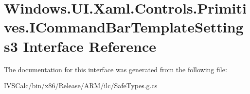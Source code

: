 \hypertarget{interface_windows_1_1_u_i_1_1_xaml_1_1_controls_1_1_primitives_1_1_i_command_bar_template_settings3}{}\section{Windows.\+U\+I.\+Xaml.\+Controls.\+Primitives.\+I\+Command\+Bar\+Template\+Settings3 Interface Reference}
\label{interface_windows_1_1_u_i_1_1_xaml_1_1_controls_1_1_primitives_1_1_i_command_bar_template_settings3}


The documentation for this interface was generated from the following file\+:\begin{DoxyCompactItemize}
\item 
I\+V\+S\+Calc/bin/x86/\+Release/\+A\+R\+M/ilc/Safe\+Types.\+g.\+cs\end{DoxyCompactItemize}
